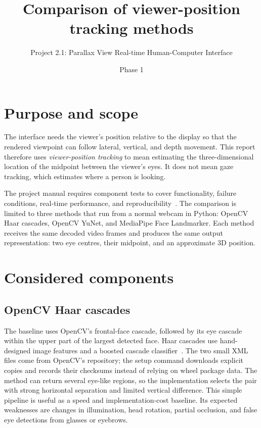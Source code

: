 \documentclass[9pt,a4paper,twocolumn]{article}
\title{Comparison of viewer-position tracking methods}
\author{Project 2.1: Parallax View Real-time Human-Computer Interface}
\date{Phase 1}
\begin{document}
\maketitle
\vspace{-1.5em}

\section{Purpose and scope}

The interface needs the viewer's position relative to the display so that the rendered viewpoint can follow lateral, vertical, and depth movement. This report therefore uses \emph{viewer-position tracking} to mean estimating the three-dimensional location of the midpoint between the viewer's eyes. It does not mean gaze tracking, which estimates where a person is looking.

The project manual requires component tests to cover functionality, failure conditions, real-time performance, and reproducibility~\cite{manual}. The comparison is limited to three methods that run from a normal webcam in Python: OpenCV Haar cascades, OpenCV YuNet, and MediaPipe Face Landmarker. Each method receives the same decoded video frames and produces the same output representation: two eye centres, their midpoint, and an approximate 3D position.

\section{Considered components}

\subsection{OpenCV Haar cascades}

The baseline uses OpenCV's frontal-face cascade, followed by its eye cascade within the upper part of the largest detected face. Haar cascades use hand-designed image features and a boosted cascade classifier~\cite{violaJones,opencvCascade}. The two small XML files come from OpenCV's repository; the setup command downloads explicit copies and records their checksums instead of relying on wheel package data. The method can return several eye-like regions, so the implementation selects the pair with strong horizontal separation and limited vertical difference. This simple pipeline is useful as a speed and implementation-cost baseline. Its expected weaknesses are changes in illumination, head rotation, partial occlusion, and false eye detections from glasses or eyebrows.
\end{document}
